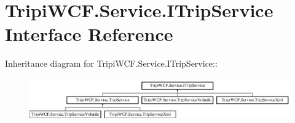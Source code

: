 \hypertarget{interface_tripi_w_c_f_1_1_service_1_1_i_trip_service}{
\section{TripiWCF.Service.ITripService Interface Reference}
\label{interface_tripi_w_c_f_1_1_service_1_1_i_trip_service}
}
Inheritance diagram for TripiWCF.Service.ITripService::\begin{figure}[H]
\begin{center}
\leavevmode
\includegraphics[height=1.80258cm]{interface_tripi_w_c_f_1_1_service_1_1_i_trip_service}
\end{center}
\end{figure}
